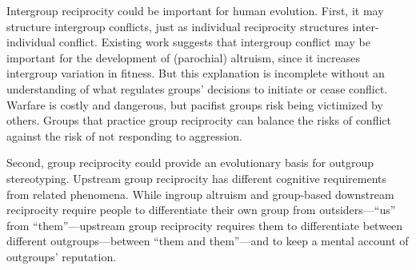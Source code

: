 \documentclass[12pt,a4paper]{article}\usepackage[]{graphicx}\usepackage[]{color}
\begin{document}

Intergroup reciprocity could be important for human evolution. First, it may structure intergroup conflicts, just as
individual reciprocity structures inter-individual conflict. Existing work suggests that intergroup conflict
may be important for the development of (parochial) altruism, since it increases intergroup variation in fitness. But
this explanation is incomplete without an understanding of what regulates groups' 
decisions to initiate or cease conflict. Warfare is costly and dangerous, but
pacifist groups risk being victimized by others. Groups that practice group reciprocity can balance 
the risks of conflict against the risk of not responding to aggression. 

Second, group reciprocity could provide an evolutionary basis for outgroup stereotyping. Upstream group reciprocity
has different cognitive requirements from
related phenomena. While ingroup altruism and group-based downstream
reciprocity require people to differentiate their own group from
outsiders---``us'' from ``them''---upstream group reciprocity requires them to
differentiate between different outgroups---between ``them and them''---and to
keep a mental account of outgroups' reputation. 
\end{document}
